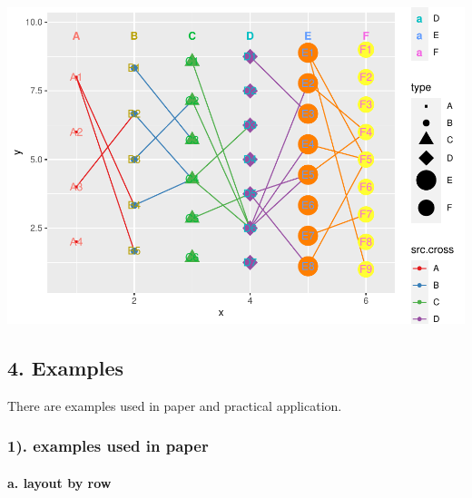 \documentclass[
]{article}
\let\oldparagraph\paragraph
\renewcommand{\paragraph}[1]{\oldparagraph{#1}\mbox{}}
\begin{document}
\includegraphics{ReadMe_files/figure-latex/unnamed-chunk-9-1.pdf}

\hypertarget{examples}{%
\subsection{4. Examples}\label{examples}}

There are examples used in paper and practical application.

\hypertarget{examples-used-in-paper}{%
\subsubsection{1). examples used in
paper}\label{examples-used-in-paper}}

\hypertarget{a.-layout-by-row}{%
\paragraph{a. layout by row}\label{a.-layout-by-row}}
\end{document}
